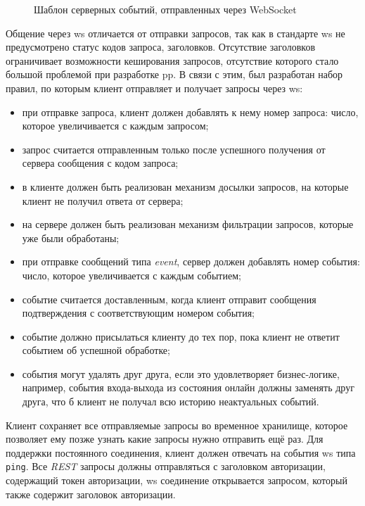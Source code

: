 \begin{figure}[h]
	
   \caption{Шаблон серверных событий, отправленных через WebSocket}
   \label{sec:development:arch:pp:communication:code:ws:response}
\end{figure}

Общение через \gls{ws} отличается от отправки запросов, так как в стандарте \gls{ws} не предусмотрено статус кодов запроса, заголовков. Отсутствие заголовков ограничивает возможности кеширования запросов, отсутствие которого стало большой проблемой при разработке \gls{pp}. В связи с этим, был разработан набор правил, по которым клиент отправляет и получает запросы через \gls{ws}:

\begin{itemize}
	\item при отправке запроса, клиент должен добавлять к нему номер запроса: число, которое увеличивается с каждым запросом;
	\item запрос считается отправленным только после успешного получения от сервера сообщения с кодом запроса;
	\item в клиенте должен быть реализован механизм досылки запросов, на которые клиент не получил ответа от сервера;
	\item на сервере должен быть реализован механизм фильтрации запросов, которые уже были обработаны;
	\item при отправке сообщений типа \textit{event}, сервер должен добавлять номер события: число, которое увеличивается с каждым событием;
	\item событие считается доставленным, когда клиент отправит сообщения подтверждения с соответствующим номером события;
	\item событие должно присылаться клиенту до тех пор, пока клиент не ответит событием об успешной обработке;
	\item события могут удалять друг друга, если это удовлетворяет бизнес-логике, например, события входа-выхода из состояния онлайн должны заменять друг друга, что б клиент не получал всю историю неактуальных событий.
\end{itemize}

Клиент сохраняет все отправляемые запросы во временное хранилище, которое позволяет ему позже узнать какие запросы нужно отправить ещё раз. Для поддержки постоянного соединения, клиент должен отвечать на события \gls{ws} типа \texttt{ping}. Все \textit{REST} запросы должны отправляться с заголовком авторизации, содержащий токен авторизации, \gls{ws} соединение открывается запросом, который также содержит заголовок авторизации.